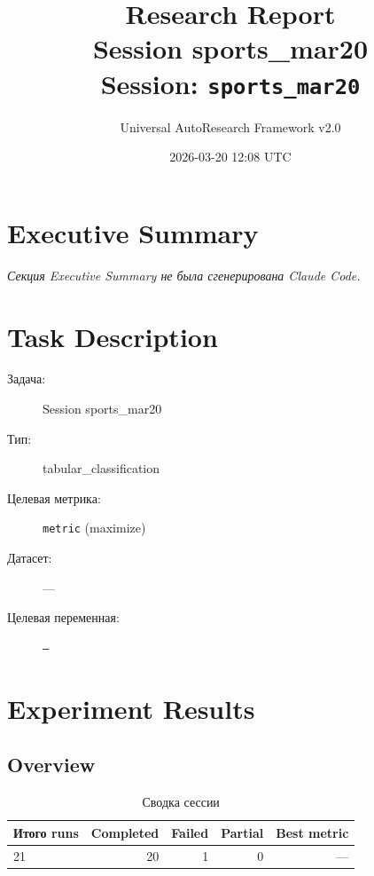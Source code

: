 \documentclass[12pt,a4paper]{article}
\title{
    \Large\textbf{Research Report}\\[0.5em]
    \large Session sports\_mar20\\[0.3em]
    \normalsize Session: \texttt{sports\_mar20}
}
\author{Universal AutoResearch Framework v2.0}
\date{2026-03-20 12:08 UTC}
\begin{document}
\maketitle
\tableofcontents
\newpage


\section{Executive Summary}

\textit{Секция Executive Summary не была сгенерирована Claude Code.}



\section{Task Description}

\begin{description}
    \item[Задача:] Session sports\_mar20
    \item[Тип:] tabular\_classification
    \item[Целевая метрика:] \texttt{metric}
        (maximize)
    \item[Датасет:] ---
    \item[Целевая переменная:] \texttt{---}
\end{description}




\section{Experiment Results}

\subsection{Overview}

\begin{table}[H]
\centering
\caption{Сводка сессии}
\begin{tabular}{lrrrr}
\toprule
Итого runs & Completed & Failed & Partial & Best metric \\
\midrule
21 & \textcolor{passcolor}{20}
    & \textcolor{failcolor}{1}
    & \textcolor{partialcolor}{0}
    & --- \\
\bottomrule
\end{tabular}
\end{table}
\end{document}
